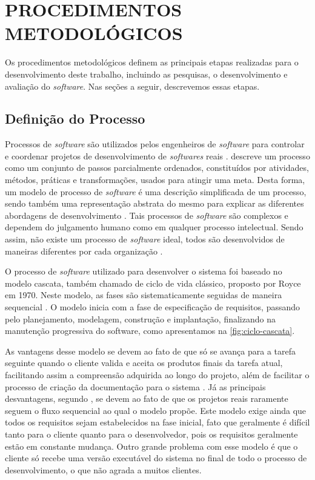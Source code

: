 \chapter{PROCEDIMENTOS METODOLÓGICOS}
\label{chap:procedimentos-metodologicos}

Os procedimentos metodológicos definem as principais etapas realizadas para o desenvolvimento deste trabalho, incluindo as pesquisas, o desenvolvimento e avaliação do \textit{software}. Nas seções a 
seguir, descrevemos essas etapas.

\section{Definição do Processo}

Processos de \textit{software} são utilizados pelos engenheiros de \textit{software} para controlar e coordenar projetos de desenvolvimento de \textit{softwares} reais \cite{talma2006desenvolvimento}. 
 descreve um processo como um conjunto de passos parcialmente ordenados, constituídos por atividades, 
métodos, práticas e transformações, usados para atingir uma meta. 
Desta forma, um modelo de processo de \textit{software} é uma descrição simplificada de um processo, sendo também uma representação abstrata do mesmo para explicar as diferentes abordagens de 
desenvolvimento \cite{sommerville2003engenharia}. Tais processos de \textit{software} são complexos e dependem do julgamento humano como 
em qualquer processo intelectual. Sendo assim, não existe um processo de \textit{software} ideal, todos são desenvolvidos de maneiras 
diferentes por cada organização \cite{sommerville2003engenharia}.

O processo de \textit{software} utilizado para desenvolver o sistema foi baseado no modelo cascata, também chamado de ciclo de vida clássico, proposto por Royce em 1970. Neste modelo, as fases são 
sistematicamente seguidas de maneira sequencial \cite{pressman2006engenharia}. O modelo inicia com a fase de especificação de requisitos, passando pelo planejamento, modelagem, construção e 
implantação, finalizando na manutenção progressiva do software, como apresentamos na \autoref{fig:ciclo-cascata}.

As vantagens desse modelo se devem ao fato de que só se avança para a tarefa seguinte quando o cliente valida e aceita os produtos finais da tarefa atual, facilitando assim a compreensão adquirida ao 
longo do projeto, além de facilitar o processo de criação da documentação para o sistema \cite{pressman2006engenharia}. Já as principais desvantagens, segundo , se 
devem ao fato de que os projetos reais raramente seguem o fluxo sequencial ao qual o modelo propõe. Este modelo exige ainda que todos os requisitos sejam estabelecidos na fase 
inicial, fato que geralmente é difícil tanto para o cliente quanto para o desenvolvedor, pois os requisitos geralmente est\~ao em constante mudan\c{c}a. Outro grande problema com esse modelo é que o 
cliente só recebe uma versão executável do sistema no final de todo o processo de desenvolvimento, o que não agrada a muitos clientes.

